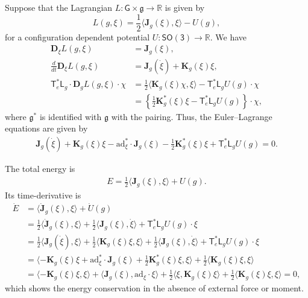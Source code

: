\documentclass[10pt]{article}
\newcommand{\braces}[1]{\ensuremath{\left\{ #1 \right\}}}
\newcommand{\pair}[1]{\ensuremath{\langle #1 \rangle}}
\newcommand{\SO}{\ensuremath{\mathsf{SO(3)}}}
\newcommand{\T}{\ensuremath{\mathsf{T}}}
\renewcommand{\L}{\ensuremath{\mathsf{L}}}
\renewcommand{\Re}{\ensuremath{\mathbb{R}}}
\newcommand{\D}{\ensuremath{\mathbf{D}}}
\newcommand{\ad}{\ensuremath{\mathrm{ad}}}
\newcommand{\G}{\ensuremath{\mathsf{G}}}
\newcommand{\g}{\ensuremath{\mathfrak{g}}}
\begin{document}
Suppose that the Lagrangian $L:\G\times \g \rightarrow \Re$ is given by
\[
    L(g,\xi) = \frac{1}{2} \pair{ \mathbf{J}_g(\xi), \xi } - U(g),
\]
for a configuration dependent potential $U:\SO\rightarrow \Re$. 
We have
\begin{align*}
    \D_\xi L(g,\xi) & = \mathbf{J}_g(\xi),\\
    \frac{d}{dt} \D_\xi L(g,\xi) & = \mathbf{J}_g(\dot \xi) + \mathbf{K}_g(\xi)\xi,\\
    \T^*_e \L_g \cdot \D_g L(g,\xi)\cdot\chi & = \frac{1}{2}\pair{\mathbf{K}_g(\xi)\chi , \xi} - \T_e^* \L_g U(g)\cdot \chi\\
                                             & = \braces{ \frac{1}{2}\mathbf{K}_g^*(\xi)\xi - \T^*_e \L_g U(g)} \cdot \chi,
\end{align*}
where $\g^*$ is identified with $\g$ with the pairing. 
Thus, the Euler--Lagrange equations are given by
\begin{gather}
    \mathbf{J}_g(\dot \xi) + \mathbf{K}_g(\xi)\xi - \ad^*_\xi \cdot \mathbf{J}_g(\xi)  - \frac{1}{2}\mathbf{K}^*_g(\xi)\xi + \T_e^* \L_g U(g) =0. \label{eqn:EL_G}
\end{gather}

The total energy is
\begin{align*}
    E = \frac{1}{2}\pair{\mathbf{J}_g(\xi), \xi} + U(g).
\end{align*}
Its time-derivative is
\begin{align*}
    \dot E & = \pair{ \dot{\mathbf{J}}_g(\xi), \xi} + \dot U(g)\\
           & =  \frac{1}{2}\pair{\dot{\mathbf{J}}_g( \xi),\xi} +
           \frac{1}{2} \pair{ \mathbf{J}_g(\xi),\dot \xi} 
           +  \T_e^*\L_g U(g)\cdot \xi\\
           & = \frac{1}{2}\pair{\mathbf{J}_g(\dot \xi), \xi} + \frac{1}{2}\pair{\mathbf{K}_g(\xi)\xi, \xi} 
           + \frac{1}{2} \pair{ \mathbf{J}_g(\xi),\dot \xi} 
           +  \T_e^*\L_g U(g)\cdot \xi\\
           & = \pair{ - \mathbf{K}_g(\xi)\xi + \ad^*_\xi \cdot \mathbf{J}_g(\xi)  + \frac{1}{2}\mathbf{K}^*_g(\xi)\xi, \xi} + \frac{1}{2}\pair{\mathbf{K}_g(\xi)\xi, \xi} \\
           & = \pair{-\mathbf{K}_g(\xi)\xi, \xi} + \pair{\mathbf{J}_g(\xi), \ad_\xi\cdot \xi} + \frac{1}{2} \pair{\xi, \mathbf{K}_g(\xi)\xi} + \frac{1}{2}\pair{\mathbf{K}_g(\xi)\xi, \xi}  = 0,
\end{align*}
which shows the energy conservation in the absence of external force or moment. 
\end{document}
